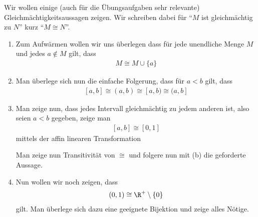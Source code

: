 \begin{exercise}
  Wir wollen einige (auch für die Übungsaufgaben sehr relevante)
  Gleichmächtigkeitsaussagen zeigen. Wir schreiben dabei für \enquote{$M$ ist
    gleichmächtig zu $N$} kurz \enquote{$M \cong N$}.
  \begin{enumerate}[label=(\alph*)]
  \item Zum Aufwärmen wollen wir uns überlegen dass für jede unendliche Menge
    $M$ und jedes $a \not\in M$ gilt, dass
    \begin{equation*}
      \begin{split}
        M \cong M\cup\{a\}
      \end{split}
    \end{equation*}
  \item Man überlege sich nun die einfache Folgerung, dass für $a < b$ gilt,
    dass
    \begin{equation*}
      \begin{split}
        [a,b] \cong (a,b) \cong [a,b) \cong (a,b]
      \end{split}
    \end{equation*}
  \item Man zeige nun, dass jedes Intervall gleichmächtig zu jedem anderen ist,
    also seien $a < b$ gegeben, zeige man
    \begin{equation*}
      \begin{split}
        [a,b] \cong [0,1]
      \end{split}
    \end{equation*}
    mittels der affin linearen Transformation
    \begin{center}
    \end{center}
    Man zeige nun Transitivität von $\cong$ und folgere nun mit (b) die
    geforderte Aussage.
  \item Nun wollen wir noch zeigen, dass
    \begin{equation*}
      \begin{split}
        (0,1) \cong \R^+\setminus \{0\}
      \end{split}
    \end{equation*}
    gilt. Man überlege sich dazu eine geeignete Bijektion und zeige alles
    Nötige.
  \end{enumerate}
\end{exercise}
